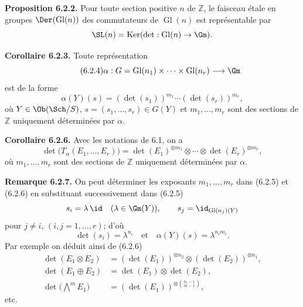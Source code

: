\documentclass[11pt]{article}
\providecommand{\Gl}{\operatorname{Gl}}
\providecommand{\Ker}{\operatorname{Ker}}
\begin{document}
\textbf{Proposition 6.2.2.} Pour toute section positive \(n\) de \(\mathbb Z\), le faisceau étale en groupes \(\Der(\Gl(n))\) des commutateurs de \(\Gl(n)\) est représentable par
\[
 \SL(n)=\Ker(\det:\Gl(n)\to\Gm).
\]

\textbf{Corollaire 6.2.3.} Toute représentation
\begin{equation}\tag{6.2.4}
 \alpha:G=\Gl(n_1)\times\cdots\times\Gl(n_r)\longrightarrow\Gm
\end{equation}
est de la forme
\begin{equation}\tag{6.2.5}
 \alpha(Y)(s)=(\det(s_1))^{m_1}\cdots(\det(s_r))^{m_r},
\end{equation}
où \(Y\in\Ob(\Sch/S)\), \(s=(s_1,\ldots,s_r)\in G(Y)\) et \(m_1,\ldots,m_r\) sont des sections de \(\mathbb Z\) uniquement déterminées par \(\alpha\).

\textbf{Corollaire 6.2.6.} Avec les notations de 6.1, on a
\begin{equation}\tag{6.2.6}
 \det\bigl(T_\alpha(E_1,\ldots,E_r)\bigr)
 =
 \det(E_1)^{\otimes m_1}\otimes\cdots\otimes
 \det(E_r)^{\otimes m_r},
\end{equation}
où \(m_1,\ldots,m_r\) sont des sections de \(\mathbb Z\) uniquement déterminées par \(\alpha\).

\textbf{Remarque 6.2.7.} On peut déterminer les exposants \(m_1,\ldots,m_r\) dans (6.2.5) et (6.2.6) en substituant successivement dans (6.2.5)
\[
 s_i=\lambda\,\id\quad(\lambda\in\Gm(Y)),\qquad
 s_j=\id_{\Gl(n_j)(Y)}
\]
pour \(j\ne i\), \((i,j=1,\ldots,r)\); d'où
\[
 \det(s_i)=\lambda^{n_i}\quad\text{et}\quad
 \alpha(Y)(s)=\lambda^{n_im_i}.
\]
Par exemple on déduit ainsi de (6.2.6)
\begin{align}
 \det(E_1\otimes E_2)&=(\det(E_1))^{\otimes n_2}\otimes(\det(E_2))^{\otimes n_1}, \tag{6.2.8}\\
 \det(E_1\oplus E_2)&=\det(E_1)\otimes\det(E_2), \tag{6.2.9}\\
 \det\bigl(\bigwedge\nolimits^m E_1\bigr)&=(\det(E_1))^{\otimes\binom{n_1-1}{m-1}},
 \tag{6.2.10}
\end{align}
etc.
\end{document}
